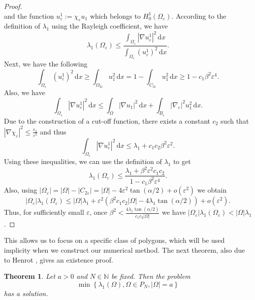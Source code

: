 \documentclass[12pt]{report}
\newtheorem{theorem}{Theorem}[section]
\numberwithin{definition}{section}
\begin{document}
\begin{proof}
\[  \] 
  and the function $u_{\varepsilon}^{1} := \chi_{\varepsilon} u_1$ which belongs to $H_{0}^{1}(\Omega_{\varepsilon})$.
  According to the definition of $\lambda_{1}$ using the Rayleigh coefficient, we have
  \[
  \lambda_{1}(\Omega_{\varepsilon}) \leq \frac{\int_{ \Omega_{\varepsilon}} \! | \nabla u_{\varepsilon}^{1} |^{2} \, \mathrm{d}x }{\int_{ \Omega_{\varepsilon}} \! (u_{\varepsilon}^{1})^{2} \, \mathrm{d}x }
  .\] 
  Next, we have the following
  \[
  \int_{ \Omega_{\varepsilon}} \! (u_{\varepsilon}^{1})^{2} \, \mathrm{d}x \geq \int_{ \Omega_{2 \varepsilon}} \! u_{1}^{2} \, \mathrm{d}x = 1 - \int_{ C_{2 \varepsilon}} \! u_{1}^{2} \, \mathrm{d}x \geq 1 - c_{1}\beta^{2}\varepsilon^{4}
  .\] 
  Also, we have
  \[
  \int_{ \Omega_{\varepsilon}} \! | \nabla u_{\varepsilon}^{1} |^{2} \, \mathrm{d}x \leq \int_{ \Omega} \! | \nabla u_{1} |^{2} \, \mathrm{d}x  + \int_{ B_{\varepsilon}} \! | \nabla_{\varepsilon} |^{2} u_{1}^{2} \, \mathrm{d}x 
  .\] 
  Due to the construction of a cut-off function, there exists a constant $c_{2}$ such that $| \nabla \chi_{\varepsilon} |^{2} \leq \frac{c_{2}}{\varepsilon^{2}}$ and thus
  \[
  \int_{ \Omega_{\varepsilon}} \! | \nabla u_{\varepsilon}^{1} |^{2} \, \mathrm{d}x \leq  \lambda_{1} + c_{1}c_{2} \beta^{2} \varepsilon^{2}
  .\] 
  Using these inequalities, we can use the definition of $\lambda_{1}$ to get
  \[
  \lambda_{1}(\Omega_{\varepsilon}) \leq \frac{\lambda_{1} + \beta^{2}\varepsilon^{2}c_{1}c_{2}}{1 - c_{1}\beta^{2}\varepsilon^{4}}
  .\] 
  Also, using $| \Omega_{\varepsilon} | = | \Omega | - | C_{2 \varepsilon} | = | \Omega | - 4 \varepsilon^{2} \tan (\alpha / 2) + o(\varepsilon^{2})$ we obtain
  \[
  | \Omega_{\varepsilon} |\lambda_{1}(\Omega_{\varepsilon}) \leq | \Omega |\lambda_{1} + \varepsilon^{2} \left( \beta^{2} c_{1}c_{2}| \Omega | - 4 \lambda_{1}\tan (\alpha / 2) \right ) + o(\varepsilon^{2})
  .\] 
  Thus, for sufficiently small $\varepsilon$, once $\beta^{2} < \frac{4 \lambda_{1}\tan(\alpha / 2)}{c_{1}c_{2}| \Omega |}$ we have $| \Omega_{\varepsilon}|\lambda_{1}(\Omega_{\varepsilon}) < | \Omega |\lambda_{1}$.
\end{proof}

This allows us to focus on a specific class of polygons, which will be used implicity when we construct our numerical method.
The next theorem, also due to Henrot \cite{henrot}, gives an existence proof.

\begin{theorem}
  Let $a > 0$ and $N \in \mathbb{N}$ be fixed.
  Then the problem
  \[
    \min \left\{ \lambda_{1}(\Omega), \Omega \in P_{N}, |\Omega| = a \right\} 
  \] 
  has a solution.
\end{theorem}
\end{document}
